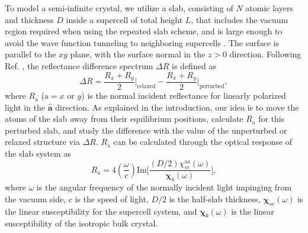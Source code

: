 \documentclass[pss]{wiley2sp} %
\begin{document}
To model a semi-infinite crystal, we utilize a slab, consisting of $N$ atomic
layers and thickness $D$ inside a supercell of total height $L$, that includes
the vacuum region required when using the repeated slab scheme, and is large
enough to avoid the wave function tunneling to neighboring supercells
\cite{mendozaPRB06}. The surface is parallel to the $xy$ plane, with the surface
normal in the $z>0$ direction. Following Ref. \cite{mendozaPRB06}, the
reflectance difference spectrum $\Delta R$ is defined as
\begin{equation}\label{eq:1}
\Delta R 
= \frac{R_{x}+R_{y}}{2}\bigg|_{\mathrm{relaxed}}
- \frac{R_{x}+R_{y}}{2}\bigg|_{\mathrm{perturbed}}
,
\end{equation}
where $R_{\mathrm{a}}$ ($\mathrm{a} = x$ or $y$) is the normal incident
reflectance for linearly polarized light in the $\hat{\mathbf{a}}$ direction. As
explained in the introduction, our idea is to move the atoms of the slab away
from their equilibrium positions, calculate $R_{\mathrm{a}}$ for this perturbed
slab, and study the difference with the value of the unperturbed or relaxed
structure via $\Delta R$. $R_{\mathrm{a}}$ can be calculated through the optical
response of the slab system \cite{delsolechap95} as
\begin{equation}\label{eq:2}
R_{\mathrm{a}} = 
4\left(\frac{\omega}{c}\right)
\mathrm{Im}
\bigg[
\frac{(D/2)\chi^{\mathrm{aa}}_{sc}(\omega)}
     {\boldsymbol{\chi}^{~}_{b}(\omega)}
\bigg]
,
\end{equation}
where $\omega$ is the angular frequency of the normally incident light impinging
from the vacuum side, $c$ is the speed of light, $D/2$ is the half-slab
thickness, $\boldsymbol{\chi}_{sc}(\omega)$ is the linear susceptibility for the
supercell system, and $\boldsymbol{\chi}^{~}_{b}(\omega)$ is the linear
susceptibility of the isotropic bulk crystal.
\end{document}
